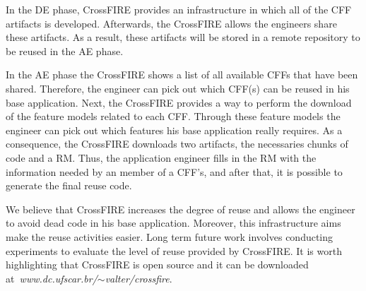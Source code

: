 

In the DE phase, CrossFIRE provides an infrastructure in which all of the CFF artifacts is developed. Afterwards, the CrossFIRE allows the engineers share these artifacts. As a result, these artifacts will be stored in a remote repository to be reused in the AE phase. 

In the AE phase the CrossFIRE shows a list of all available CFFs that have been shared. Therefore, the engineer can pick out which CFF(s) can be reused in his base application. Next, the CrossFIRE provides a way to perform the download of the feature models related to each CFF. Through these feature models the engineer can pick out which features his base application really requires. As a consequence, the CrossFIRE downloads two artifacts, the necessaries chunks of code and a RM. Thus, the application engineer fills in the RM with the information needed by an member of a CFF's, and after that, it is possible to generate the final reuse code.

We believe that CrossFIRE increases the degree of reuse and allows the engineer to avoid dead code in his base application. Moreover, this infrastructure aims make the reuse activities easier. Long term future work involves conducting experiments to evaluate the level of reuse provided by CrossFIRE. It is worth highlighting that CrossFIRE is open source and it can be downloaded at\textit{~www.dc.ufscar.br/$\sim$valter/crossfire}.










